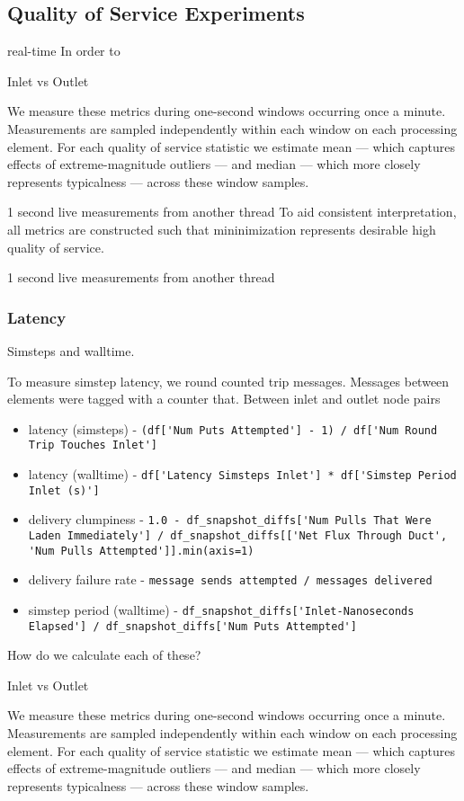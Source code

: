 \subsection{Quality of Service Experiments} \label{sec:quality-of-service-experiments}

real-time
In order to

Inlet vs Outlet

We measure these metrics during one-second windows occurring once a minute.
Measurements are sampled independently within each window on each processing element.
For each quality of service statistic we estimate mean --- which captures effects of extreme-magnitude outliers --- and median --- which more closely represents typicalness --- across these window samples.


1 second live measurements from another thread
To aid consistent interpretation, all metrics are constructed such that mininimization represents desirable high quality of service.



1 second live measurements from another thread

\subsubsection{Latency}

Simsteps and walltime.

To measure simstep latency, we round counted trip messages.
Messages between elements were tagged with a counter that.
Between inlet and outlet node pairs

\begin{itemize}
  \item latency (simsteps)
    - \verb|(df['Num Puts Attempted'] - 1) / df['Num Round Trip Touches Inlet']|
  \item latency (walltime)
    - \verb|df['Latency Simsteps Inlet'] * df['Simstep Period Inlet (s)']|
  \item delivery clumpiness
    - \verb|1.0 - df_snapshot_diffs['Num Pulls That Were Laden Immediately'] / df_snapshot_diffs[['Net Flux Through Duct', 'Num Pulls Attempted']].min(axis=1)|
  \item delivery failure rate
    - \verb|message sends attempted / messages delivered|
  \item simstep period (walltime)
    - \verb|df_snapshot_diffs['Inlet-Nanoseconds Elapsed'] / df_snapshot_diffs['Num Puts Attempted']|
\end{itemize}

How do we calculate each of these?

Inlet vs Outlet


We measure these metrics during one-second windows occurring once a minute.
Measurements are sampled independently within each window on each processing element.
For each quality of service statistic we estimate mean --- which captures effects of extreme-magnitude outliers --- and median --- which more closely represents typicalness --- across these window samples.
